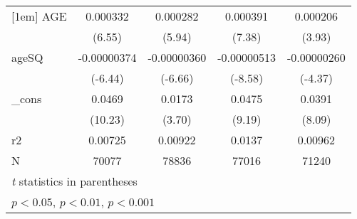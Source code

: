 \begin{table}[htbp]
\begin{tabular}{l*{4}{c}}
[1em]
AGE         &    0.000332\sym{***}&    0.000282\sym{***}&    0.000391\sym{***}&    0.000206\sym{***}\\
            &      (6.55)         &      (5.94)         &      (7.38)         &      (3.93)         \\
[1em]
ageSQ       & -0.00000374\sym{***}& -0.00000360\sym{***}& -0.00000513\sym{***}& -0.00000260\sym{***}\\
            &     (-6.44)         &     (-6.66)         &     (-8.58)         &     (-4.37)         \\
[1em]
\_cons      &      0.0469\sym{***}&      0.0173\sym{***}&      0.0475\sym{***}&      0.0391\sym{***}\\
            &     (10.23)         &      (3.70)         &      (9.19)         &      (8.09)         \\
\hline
r2          &     0.00725         &     0.00922         &      0.0137         &     0.00962         \\
N           &       70077         &       78836         &       77016         &       71240         \\
\hline\hline
\multicolumn{5}{l}{\footnotesize \textit{t} statistics in parentheses}\\
\multicolumn{5}{l}{\footnotesize \sym{*} \(p<0.05\), \sym{**} \(p<0.01\), \sym{***} \(p<0.001\)}\\
\end{tabular}
\end{table}
